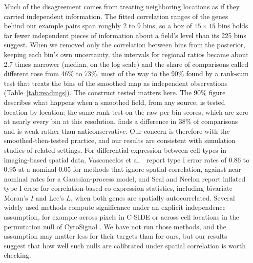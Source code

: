 \documentclass[10pt,letterpaper]{article}
\begin{document}
Much of the disagreement comes from treating neighboring locations as if they carried independent information. The fitted correlation ranges of the genes behind our example pairs span roughly 2 to 9 bins, so a box of $15\times15$ bins holds far fewer independent pieces of information about a field's level than its 225 bins suggest. When we removed only the correlation between bins from the posterior, keeping each bin's own uncertainty, the intervals for regional ratios became about 2.7 times narrower (median, on the log scale) and the share of comparisons called different rose from 46\% to 73\%, most of the way to the 90\% found by a rank-sum test that treats the bins of the smoothed map as independent observations (Table~\ref{tab:readings}). The construct tested matters here. The 90\% figure describes what happens when a smoothed field, from any source, is tested location by location; the same rank test on the raw per-bin scores, which are zero at nearly every bin at this resolution, finds a difference in 38\% of comparisons and is weak rather than anticonservative. Our concern is therefore with the smoothed-then-tested practice, and our results are consistent with simulation studies of related settings. For differential expression between cell types in imaging-based spatial data, Vasconcelos et al.\ \cite{vasconcelos2026smide} report type I error rates of 0.86 to 0.95 at a nominal 0.05 for methods that ignore spatial correlation, against near-nominal rates for a Gaussian-process model, and Seal and Neelon \cite{seal2026spacebf} report inflated type I error for correlation-based co-expression statistics, including bivariate Moran's $I$ and Lee's $L$, when both genes are spatially autocorrelated. Several widely used methods compute significance under an explicit independence assumption, for example across pixels in C-SIDE \cite{cable2022cside} or across cell locations in the permutation null of CytoSignal \cite{Liu2026}. We have not run those methods, and the assumption may matter less for their targets than for ours, but our results suggest that how well such nulls are calibrated under spatial correlation is worth checking.
\end{document}
